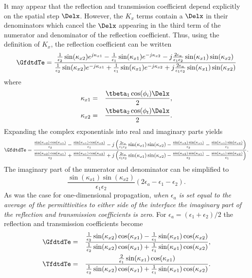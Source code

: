 It may appear that the reflection and transmission coefficient depend
explicitly on the spatial step $\Delx$.  However, the $K_x$ terms
contain a $\Delx$ in their denominators which cancel the $\Delx$
appearing in the third term of the numerator and denominator of the
reflection coefficient.  Thus, using the definition of $K_x$, the
reflection coefficient can be written
\begin{equation}
  \GfdtdTe = \frac
  {\frac{1}{\epsilon_2}\sin(\kappa_{x2})e^{j\kappa_{x1}} -
   \frac{1}{\epsilon_1}\sin(\kappa_{x1})e^{-j\kappa_{x2}} -
   j\frac{2\epsilon_a}{\epsilon_1\epsilon_2}
    \sin(\kappa_{x1})\sin(\kappa_{x2})}
  {\frac{1}{\epsilon_2}\sin(\kappa_{x2})e^{-j\kappa_{x1}} +
   \frac{1}{\epsilon_1}\sin(\kappa_{x1})e^{-j\kappa_{x2}} +
   j\frac{2\epsilon_a}{\epsilon_1\epsilon_2}
    \sin(\kappa_{x1})\sin(\kappa_{x2})}
\end{equation}
where
\begin{eqnarray}
  \kappa_{x1} &=& \frac{\tbeta_1\cos(\phi_i)\Delx}{2}, \\
  \kappa_{x2} &=& \frac{\tbeta_2\cos(\phi_t)\Delx}{2}.
\end{eqnarray}
Expanding the complex exponentials into real and imaginary parts
yields
\begin{equation}
  \GfdtdTe = \frac
  {\frac{\sin(\kappa_{x2})\cos(\kappa_{x1})}{\epsilon_2} -
   \frac{\sin(\kappa_{x1})\cos(\kappa_{x2})}{\epsilon_1} -
   j\left(\frac{2\epsilon_a}{\epsilon_1\epsilon_2} 
           \sin(\kappa_{x1})\sin(\kappa_{x2}) -
        \frac{\sin(\kappa_{x2})\sin(\kappa_{x1})}{\epsilon_2} -
        \frac{\sin(\kappa_{x1})\sin(\kappa_{x2})}{\epsilon_1}\right)}
  {\frac{\sin(\kappa_{x2})\cos(\kappa_{x1})}{\epsilon_2} +
   \frac{\sin(\kappa_{x1})\cos(\kappa_{x2})}{\epsilon_1} +
   j\left(\frac{2\epsilon_a}{\epsilon_1\epsilon_2} 
           \sin(\kappa_{x1})\sin(\kappa_{x2}) -
        \frac{\sin(\kappa_{x2})\sin(\kappa_{x1})}{\epsilon_2} -
        \frac{\sin(\kappa_{x1})\sin(\kappa_{x2})}{\epsilon_1}\right)}.
\end{equation}
The imaginary part of the numerator and denominator can be simplified to
\begin{equation}
  \frac{\sin(\kappa_{x1})\sin(\kappa_{x2})}{\epsilon_1\epsilon_2} 
        \left(2\epsilon_a - \epsilon_1 - \epsilon_2\right).
\end{equation}
As was the case for one-dimensional propagation, {\em when
  $\epsilon_a$ is set equal to the average of the permittivities to
  either side of the interface the imaginary part of the reflection
  and transmission coefficients is zero}.  For
$\epsilon_a=(\epsilon_1+\epsilon_2)/2$ the reflection and transmission
coefficients become
\begin{eqnarray}
  \GfdtdTe &=& \frac
  {\frac{1}{\epsilon_2}\sin(\kappa_{x2})\cos(\kappa_{x1}) -
   \frac{1}{\epsilon_1}\sin(\kappa_{x1})\cos(\kappa_{x2})}
  {\frac{1}{\epsilon_2}\sin(\kappa_{x2})\cos(\kappa_{x1}) +
   \frac{1}{\epsilon_1}\sin(\kappa_{x1})\cos(\kappa_{x2})}, \\
  \TfdtdTe &=& \frac
  {\frac{2}{\epsilon_1}\sin(\kappa_{x1})\cos(\kappa_{x1})}
  {\frac{1}{\epsilon_2}\sin(\kappa_{x2})\cos(\kappa_{x1}) +
   \frac{1}{\epsilon_1}\sin(\kappa_{x1})\cos(\kappa_{x2})}.
\end{eqnarray}  
